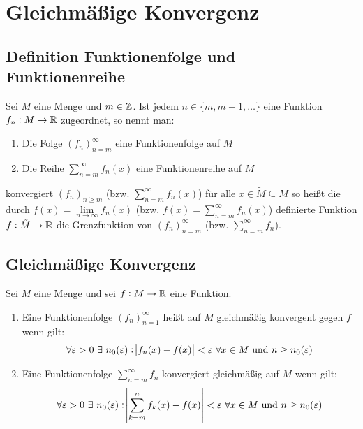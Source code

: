 \section{Gleichmäßige Konvergenz}
\subsection{Definition Funktionenfolge und Funktionenreihe}
Sei $M$ eine Menge und $m \in \mathbb{Z}$. Ist jedem $n \in \{m, m+1, \ldots\}$ eine
Funktion $f_n: M \rightarrow \mathbb{R}$ zugeordnet, so nennt man:
\begin{enumerate}[label= (\alph*)]
    \item Die Folge ${(f_n)}_{n=m}^\infty$ eine Funktionenfolge auf $M$
    \item Die Reihe $\sum_{n=m}^\infty f_n(x)$ eine Funktionenreihe auf $M$
\end{enumerate}

konvergiert ${(f_n)}_{n \geq m}$ (bzw. $\sum_{n=m}^\infty f_n(x)$) für alle
$x \in \tilde{M} \subseteq M$ so heißt die durch $f(x) = \lim\limits_{n \rightarrow \infty}
f_n(x)$ (bzw. $f(x) = \sum_{n=m}^\infty f_n(x)$) definierte Funktion $f:
\tilde{M} \rightarrow \mathbb{R}$ die Grenzfunktion von ${(f_n)}_{n=m}^\infty$
(bzw. $\sum_{n=m}^\infty f_n$).

\subsection{Gleichmäßige Konvergenz}
Sei $M$ eine Menge und sei $f: M \rightarrow \mathbb{R}$ eine Funktion.
\begin{enumerate}[label= (\alph*)]
    \item Eine Funktionenfolge ${(f_n)}_{n=1}^\infty$ heißt auf $M$ gleichmäßig
        konvergent gegen $f$ wenn gilt:
        \begin{equation*}
            \forall \varepsilon > 0\  \exists\ n_0(\varepsilon):
                \abs{f_n(x) - f(x)} < \varepsilon\
                \forall x \in M \text{ und } n \geq n_0(\varepsilon)
        \end{equation*}
    \item Eine Funktionenfolge $\sum_{n=m}^\infty f_n$ konvergiert gleichmäßig
        auf $M$ wenn gilt:
            \begin{equation*}
                \forall \varepsilon > 0\ \exists\ n_0(\varepsilon): \abs{\sum_{k=m}^n f_k(x) - f(x)}
                    < \varepsilon\ \forall x \in M \text{ und } n \geq n_0(\varepsilon)
            \end{equation*}
\end{enumerate}


